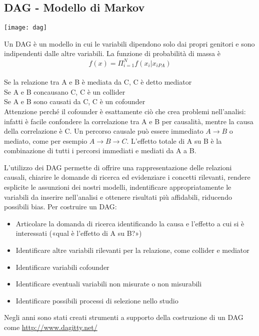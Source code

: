 \subsection{DAG - Modello di Markov}
\begin{marginfigure}
    \texttt{[image: dag]}
\end{marginfigure}
Un DAG è un modello in cui le variabili dipendono solo dai propri genitori e sono 
indipendenti dalle altre variabili. 
La funzione di probabilità di massa è 
\begin{equation}
    f(x) = \Pi_{i = 1}^N f(x_i|x_{iPA})
\end{equation}
\\Se la relazione tra A e B è mediata da C, C è detto mediator\\
Se A e B concausano C, C è un collider\\
Se A e B sono causati da C, C è un cofounder\\
Attenzione perché il cofounder è esattamente ciò che crea problemi nell'analisi: infatti è 
facile confondere la correlazione tra A e B per causalità, mentre la causa della correlazione
è C.
Un percorso causale può essere immediato $A \to B$ o mediato, come per esempio $A \to B \to C$.
L'effetto totale di A su B è la combinazione di tutti i percorsi immediati e mediati da A a B.

L'utilizzo dei DAG permette di offrire una rappresentazione delle relazioni causali,
chiarire le domande di ricerca ed evidenziare i concetti rilevanti, rendere esplicite le 
assunzioni dei nostri modelli, indentificare appropriatamente le variabili da inserire nell’analisi
e ottenere risultati più affidabili, riducendo possibili bias.
Per costruire un DAG: 
\begin{itemize}
    \item Articolare la domanda di ricerca identificando la causa e l’effetto a cui si è 
        interessati («qual è l’effetto di A su B?»)
    \item Identificare altre variabili rilevanti per la relazione, come collider e mediator
    \item Identificare variabili cofounder
    \item Identificare eventuali variabili non misurate o non misurabili
    \item Identificare possibili processi di selezione nello studio
\end{itemize}
Negli anni sono stati creati strumenti a supporto della costruzione di un DAG come 
\url{http://www.dagitty.net/}
\vspace{0.5cm}

